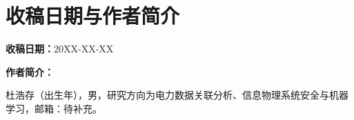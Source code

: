 \documentclass[UTF8,zihao=5,twoside]{ctexart}
\numberwithin{equation}{section}
\begin{document}
\section*{收稿日期与作者简介}
\noindent\textbf{收稿日期：}20XX-XX-XX

\noindent\textbf{作者简介：}\par
\noindent 杜浩存（出生年），男，研究方向为电力数据关联分析、信息物理系统安全与机器学习，邮箱：待补充。
\end{document}
